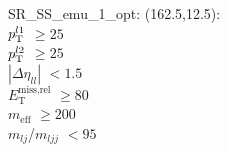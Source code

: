 SR\_SS\_emu\_1\_opt: (162.5,12.5): \\
$p_{\text{T}}^{l1}$ $\geq 25$ \\
$p_{\text{T}}^{l2}$ $\geq 25$ \\
$|\Delta\eta_{ll}|$ $<1.5$ \\
$E_{\text{T}}^{\text{miss,rel}}$ $\geq 80$ \\
$m_{\text{eff}}$ $\geq 200$ \\
$m_{lj}$/$m_{ljj}$ $<95$ \\
